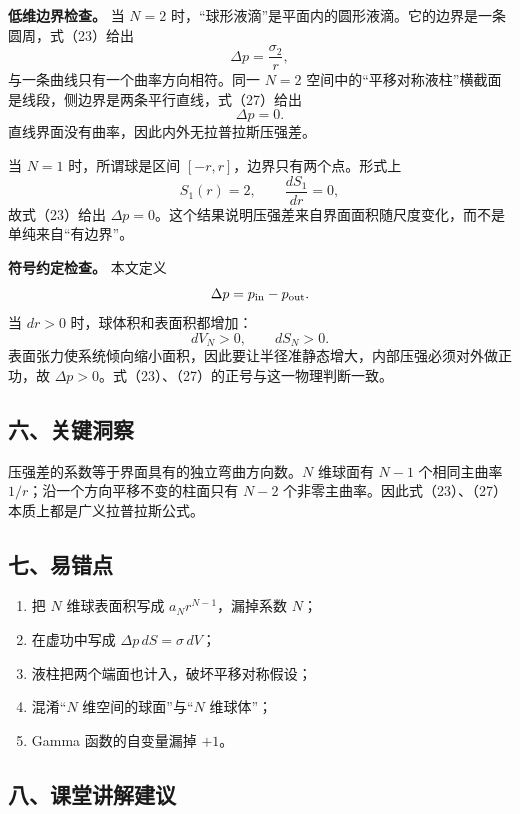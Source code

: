 \documentclass[12pt,a4paper,UTF8]{ctexart}
\newcommand{\tightlist}{\setlength{\itemsep}{0pt}\setlength{\parskip}{0pt}}
\begin{document}
\textbf{低维边界检查。} 当 \(N=2\)
时，``球形液滴''是平面内的圆形液滴。它的边界是一条圆周，式（23）给出 \[
\Delta p=\frac{\sigma_2}{r},
\] 与一条曲线只有一个曲率方向相符。同一 \(N=2\)
空间中的``平移对称液柱''横截面是线段，侧边界是两条平行直线，式（27）给出
\[
\Delta p=0.
\] 直线界面没有曲率，因此内外无拉普拉斯压强差。

当 \(N=1\) 时，所谓球是区间 \([-r,r]\)，边界只有两个点。形式上 \[
S_1(r)=2,
\qquad
\frac{dS_1}{dr}=0,
\] 故式（23）给出
\(\Delta p=0\)。这个结果说明压强差来自界面面积随尺度变化，而不是单纯来自``有边界''。

\textbf{符号约定检查。} 本文定义 \[
\Delta p=p_{\rm in}-p_{\rm out}.
\] 当 \(dr>0\) 时，球体积和表面积都增加： \[
dV_N>0,\qquad dS_N>0.
\]
表面张力使系统倾向缩小面积，因此要让半径准静态增大，内部压强必须对外做正功，故
\(\Delta p>0\)。式（23）、（27）的正号与这一物理判断一致。

\subsection{六、关键洞察}\label{ux516dux5173ux952eux6d1eux5bdf-2}

压强差的系数等于界面具有的独立弯曲方向数。\(N\) 维球面有 \(N-1\)
个相同主曲率 \(1/r\)；沿一个方向平移不变的柱面只有 \(N-2\)
个非零主曲率。因此式（23）、（27）本质上都是广义拉普拉斯公式。

\subsection{七、易错点}\label{ux4e03ux6613ux9519ux70b9-2}

\begin{enumerate}
\def\labelenumi{\arabic{enumi}.}
\tightlist
\item
  把 \(N\) 维球表面积写成 \(a_Nr^{N-1}\)，漏掉系数 \(N\)；
\item
  在虚功中写成 \(\Delta p\,dS=\sigma\,dV\)；
\item
  液柱把两个端面也计入，破坏平移对称假设；
\item
  混淆``\(N\) 维空间的球面''与``\(N\) 维球体''；
\item
  Gamma 函数的自变量漏掉 \(+1\)。
\end{enumerate}

\subsection{八、课堂讲解建议}\label{ux516bux8bfeux5802ux8bb2ux89e3ux5efaux8bae-2}
\end{document}
